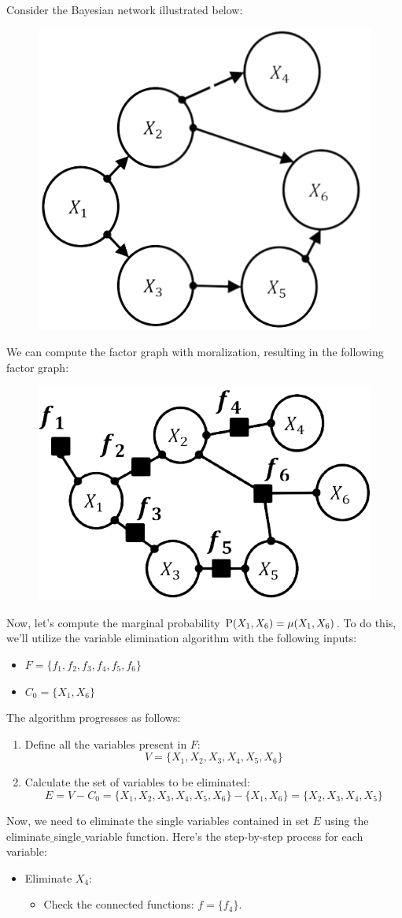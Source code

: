 \begin{example}
    Consider the Bayesian network illustrated below:
    \begin{figure}[H]
        \centering
        \includegraphics[width=0.25\linewidth]{images/bn.png}
    \end{figure}
    We can compute the factor graph with moralization, resulting in the following factor graph:
    \begin{figure}[H]
        \centering
        \includegraphics[width=0.25\linewidth]{images/bnf1.png}
    \end{figure}
    Now, let's compute the marginal probability $\textnormal{P}(X_1,X_6)=\mu(X_1,X_6)$. To do this, we'll utilize the variable elimination algorithm with the following inputs:
    \begin{itemize}
        \item $F=\{f_1,f_2,f_3,f_4,f_5,f_6\}$
        \item $C_0=\{X_1,X_6\}$
    \end{itemize}
    The algorithm progresses as follows:
    \begin{enumerate}
        \item Define all the variables present in $F$: 
            \[V=\{X_1,X_2,X_3,X_4,X_5,X_6\}\]
        \item Calculate the set of variables to be eliminated:
            \[E=V-C_0=\{X_1,X_2,X_3,X_4,X_5,X_6\}-\{X_1,X_6\}=\{X_2,X_3,X_4,X_5\}\]
    \end{enumerate}
    Now, we need to eliminate the single variables contained in set $E$ using the  eliminate$\_$single$\_$variable function. Here's the step-by-step process for each variable:
    \begin{itemize}
        \item Eliminate $X_4$: 
            \begin{itemize}
                \item Check the connected functions: $f=\{f_4\}$. 

\end{itemize}
\end{itemize}
\end{example}
